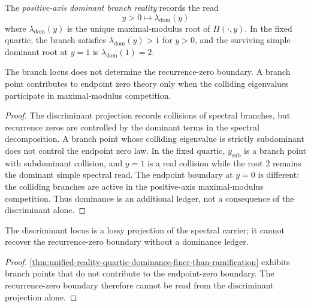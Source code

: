 \begin{definition}
\label{def:unified-reality-quartic-dominant-branch-reality}
The \emph{positive-axis dominant branch reality} records the read
$$
y>0\longmapsto \lambda_{\mathrm{dom}}(y)
$$
where $\lambda_{\mathrm{dom}}(y)$ is the unique maximal-modulus root of
$\Pi(\cdot,y)$. In the fixed quartic, the branch satisfies
$\lambda_{\mathrm{dom}}(y)>1$ for $y>0$, and the surviving simple
dominant root at $y=1$ is $\lambda_{\mathrm{dom}}(1)=2$.
\end{definition}

\begin{theorem}
\label{thm:unified-reality-quartic-dominance-finer-than-ramification}
The branch locus does not determine the recurrence-zero boundary. A
branch point contributes to endpoint zero theory only when the colliding
eigenvalues participate in maximal-modulus competition.
\end{theorem}

\begin{proof}
The discriminant projection records collisions of spectral branches, but
recurrence zeros are controlled by the dominant terms in the spectral
decomposition. A branch point whose colliding eigenvalue is strictly
subdominant does not control the endpoint zero law. In the fixed
quartic, $y_{\mathrm{sub}}$ is a branch point with subdominant collision,
and $y=1$ is a real collision while the root $2$ remains the dominant
simple spectral read. The endpoint boundary at $y=0$ is different: the
colliding branches are active in the positive-axis maximal-modulus
competition. Thus dominance is an additional ledger, not a consequence
of the discriminant alone.
\end{proof}

\begin{corollary}
\label{cor:unified-reality-quartic-discriminant-projection-lossy}
The discriminant locus is a lossy projection of the spectral carrier; it
cannot recover the recurrence-zero boundary without a dominance ledger.
\end{corollary}

\begin{proof}
\autoref{thm:unified-reality-quartic-dominance-finer-than-ramification}
exhibits branch points that do not contribute to the endpoint-zero
boundary. The recurrence-zero boundary therefore cannot be read from the
discriminant projection alone.
\end{proof}

